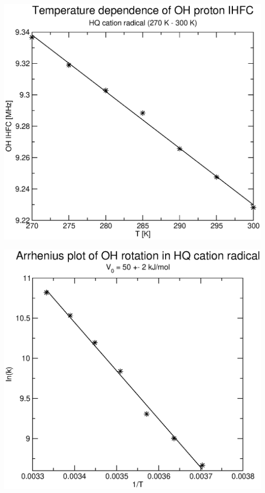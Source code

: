 \documentclass[byrevtex,amssymb,aps,pra,floatfix,letterpaper]{revtex4}
\begin{document}
\begin{center}
\includegraphics*[scale=0.4]{fig17}
\end{center}

\begin{center}
\includegraphics*[scale=0.4]{fig18}
\end{center}
\end{document}
